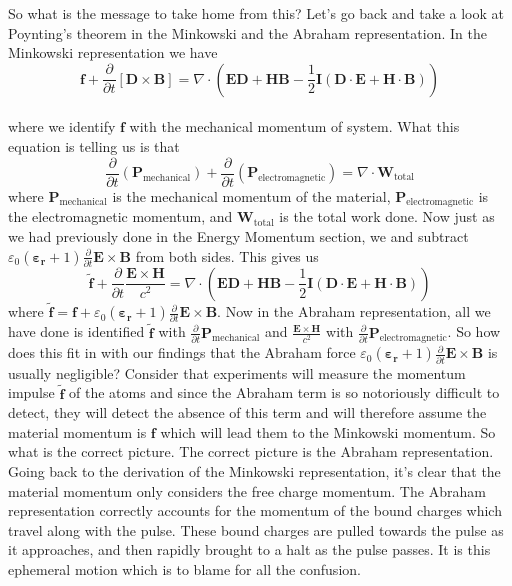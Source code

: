 \documentclass[twocolumn,english,pra,aps,superscriptaddress,floatfix]{revtex4-1}
\begin{document}
So what is the message to take home from this?  Let's go back and take a look at Poynting's theorem in the Minkowski and the Abraham representation.  In the Minkowski representation we have
\begin{equation}
\mathbf{f}+\frac{\partial}{\partial t}\left[\mathbf{D}\times\mathbf{B}\right]=\nabla\cdot\left(\mathbf{E}\mathbf{D}+\mathbf{H}\mathbf{B}-\frac{1}{2}\mathbf{I}\left(\mathbf{D}\cdot\mathbf{E}+\mathbf{H}\cdot\mathbf{B}\right)\right)
\end{equation}
\\
where we identify $\mathbf{f}$ with the mechanical momentum of system.  What this equation is telling us is that 
\begin{equation}
\frac{\partial}{\partial t}\left(\mathbf{P}_{\mathrm{mechanical}}\right)+\frac{\partial}{\partial t}\left(\mathbf{P}_{\mathrm{electromagnetic}}\right)=\nabla\cdot\mathbf{W}_{\mathrm{total}}
\end{equation}
where $\mathbf{P}_{\mathrm{mechanical}}$ is the mechanical momentum of the material, $\mathbf{P}_{\mathrm{electromagnetic}}$ is the electromagnetic momentum, and $\mathbf{W}_{\mathrm{total}}$ is the total work done.  Now just as we had previously done in the Energy Momentum section, we and subtract  
$\varepsilon_0\left(\mathbf{\varepsilon_r}+1\right)\frac{\partial}{\partial t}\mathbf{E}\times\mathbf{B}$ from both sides.  This gives us
\begin{equation}
\tilde{\mathbf{f}}+\frac{\partial}{\partial t}\frac{\mathbf{E}\times\mathbf{H}}{c^2} =\nabla\cdot\left(\mathbf{E}\mathbf{D}+\mathbf{H}\mathbf{B}-\frac{1}{2}\mathbf{I}\left(\mathbf{D}\cdot\mathbf{E}+\mathbf{H}\cdot\mathbf{B}\right)\right)
\end{equation}
where $\tilde{\mathbf{f}}=\mathbf{f}+\varepsilon_0\left(\mathbf{\varepsilon_r}+1\right)\frac{\partial}{\partial t}\mathbf{E}\times\mathbf{B}$.  Now in the Abraham representation, all we have done is identified $\tilde{\mathbf{f}}$ with $\frac{\partial}{\partial t}\mathbf{P}_{\mathrm{mechanical}}$ and $\frac{\mathbf{E}\times\mathbf{H}}{c^2}$ with $\frac{\partial}{\partial t}\mathbf{P}_{\mathrm{electromagnetic}}$.  So how does this fit in with our findings that the Abraham force $\varepsilon_0\left(\mathbf{\varepsilon_r}+1\right)\frac{\partial}{\partial t}\mathbf{E}\times\mathbf{B}$ is usually negligible?  Consider that experiments will measure the momentum impulse $\tilde{\mathbf{f}}$ of the atoms and since the Abraham term is so notoriously difficult to detect, they will detect the absence of this term and will therefore assume the material momentum is $\mathbf{f}$ which will lead them to the Minkowski momentum.  So what is the correct picture.  The correct picture is the Abraham representation.  Going back to the derivation of the Minkowski representation, it's clear that the material momentum only considers the free charge momentum.  The Abraham representation correctly accounts for the momentum of the bound charges which travel along with the pulse.  These bound charges are pulled towards the pulse as it approaches, and then rapidly brought to a halt as the pulse passes.  It is this ephemeral motion which is to blame for all the confusion.  
\end{document}
